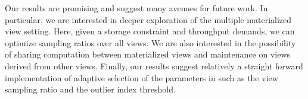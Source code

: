 Our results are promising and suggest many avenues for future work.
In particular, we are interested in deeper exploration of the multiple materialized view setting.
Here, given a storage constraint and throughput demands, we can optimize sampling ratios over all views.
We are also interested in the possibility of sharing computation between materialized views and maintenance on views derived from other views.
Finally, our results suggest relatively a straight forward implementation of adaptive selection of the parameters in \svc such as the view sampling ratio and the outlier index threshold.





